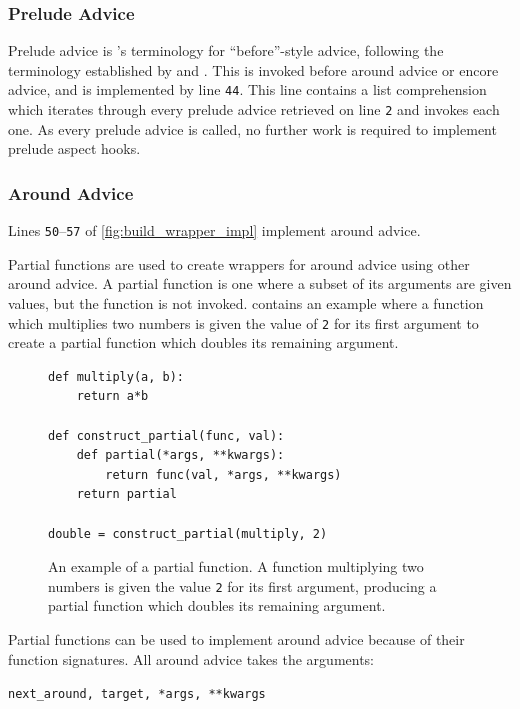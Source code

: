 \subsubsection{Prelude Advice}

Prelude advice is \pdsfthree{}'s terminology for ``before''-style advice,
following the terminology established by \pydysofu and \theatreag{}. This is
invoked before around advice or encore advice, and is implemented by line
\texttt{44}. This line contains a list comprehension which iterates through
every prelude advice retrieved on line \texttt{2} and invokes each one. As every
prelude advice is called, no further work is required to implement prelude
aspect hooks.

\subsubsection{Around Advice}

Lines \texttt{50}--\texttt{57} of \cref{fig:build_wrapper_impl} implement around advice.

Partial functions are used to create wrappers for around advice using other
around advice. A partial function is one where a subset of its arguments are
given values, but the function is not invoked.
 contains an example where a function
which multiplies two numbers is given the value of \lstinline{2} for its first
argument to create a partial function which doubles its remaining argument.

\begin{figure}
\begin{lstlisting}[style=footnotesize_python]
def multiply(a, b):
    return a*b

def construct_partial(func, val):
    def partial(*args, **kwargs):
        return func(val, *args, **kwargs)
    return partial

double = construct_partial(multiply, 2)
\end{lstlisting}
\caption{An example of a partial function. A function multiplying two numbers is
given the value \lstinline{2} for its first argument, producing a partial
function which doubles its remaining argument.}
\label{fig:partial_function_explanation}
\end{figure}

Partial functions can be used to implement around advice because of their
function signatures. All around advice takes the arguments:

{\centering

\lstinline{next_around, target, *args, **kwargs}

}


